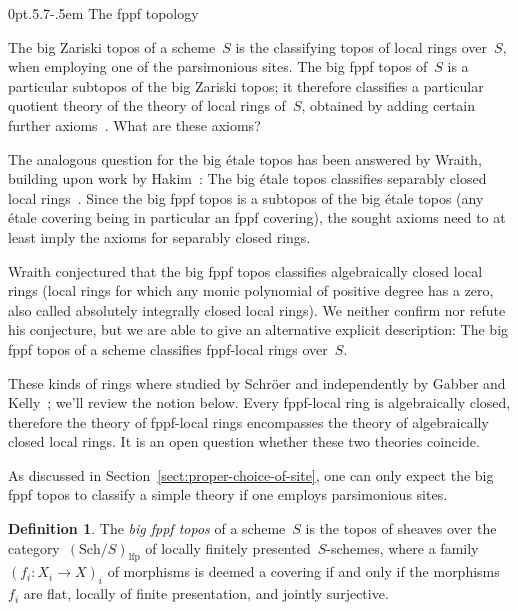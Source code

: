 \documentclass[10pt,reqno,a4paper]{amsbook}
\makeatletter
\theoremstyle{definition}
\newtheorem{defn}{Definition}[section]
\theoremstyle{plain}
\theoremstyle{remark}
\newcommand{\Sch}{\mathrm{Sch}}
\newcommand{\lfp}{\mathrm{lfp}}
\newcommand{\?}{\,{:}\,}
\renewcommand{\_}{\mathpunct{.}\,}
\def\subsection{\@startsection{subsection}{2}%
  {0pt}{.5\linespacing\@plus.7\linespacing}{-.5em}%
  {\normalfont\bfseries}}
\makeatother
\begin{document}
\subsection{The fppf topology}

The big Zariski topos of a scheme~$S$ is the classifying topos of local rings
over~$S$, when employing one of the parsimonious sites. The big fppf topos
of~$S$ is a particular subtopos of the big Zariski topos; it therefore
classifies a particular quotient theory of the theory of local rings of~$S$,
obtained by adding certain further axioms~\cite{caramello:lattices}. What are
these axioms?

The analogous question for the big étale topos has been answered by Wraith,
building upon work by Hakim~\cite{hakim:relative-schemes}: The big étale topos
classifies separably closed local rings~\cite{wraith:generic-galois-theory}.
Since the big fppf topos is a subtopos of the big étale topos (any étale
covering being in particular an fppf covering), the sought axioms need to at
least imply the axioms for separably closed rings.

Wraith conjectured that the big fppf topos classifies algebraically closed
local rings (local rings for which any monic polynomial of positive degree has
a zero, also called absolutely integrally closed local rings). We neither confirm nor
refute his conjecture, but we are able to give an alternative explicit
description: The big fppf topos of a scheme classifies fppf-local rings
over~$S$.

These kinds of rings where studied by Schröer and independently by Gabber and
Kelly~\cite{schroer:points-fppf,gabber:kelly:points}; we'll review the notion
below. Every fppf-local ring is algebraically closed, therefore the theory of
fppf-local rings encompasses the theory of algebraically closed local rings. It
is an open question whether these two theories coincide.

As discussed in Section~\ref{sect:proper-choice-of-site}, one can only expect
the big fppf topos to classify a simple theory if one employs parsimonious
sites.

\begin{defn}The \emph{big fppf topos} of a scheme~$S$ is the topos of sheaves
over the category~$(\Sch/S)_\lfp$ of locally finitely presented~$S$-schemes, where a
family~$(f_i : X_i \to X)_i$ of morphisms is deemed a covering if and only if
the morphisms~$f_i$ are flat, locally of finite presentation, and jointly surjective.\end{defn}
\end{document}
